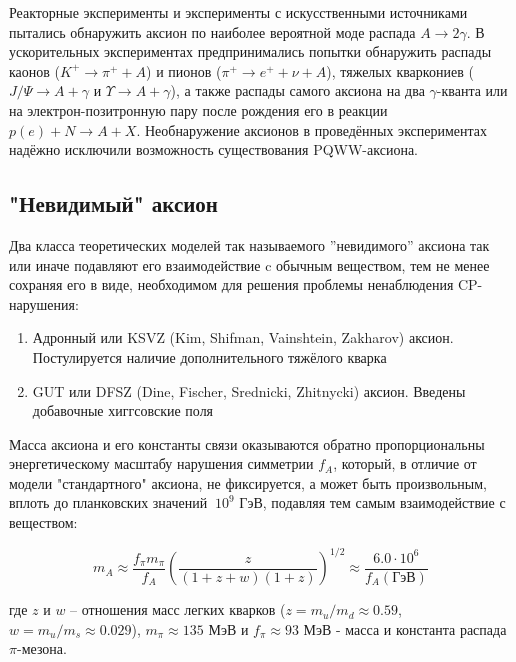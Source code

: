 \documentclass[a4paper,article,14pt]{extarticle}
\begin{document}
Реакторные эксперименты и эксперименты с искусственными источниками \cite{ReactorExperiment1, ReactorExperiment2} пытались обнаружить аксион по наиболее вероятной моде распада $A \rightarrow 2\gamma$. В ускорительных экспериментах \cite{AcceleratorExperiment1, AcceleratorExperiment2} предпринимались попытки обнаружить распады каонов ($K^+ \rightarrow \pi^+ + A$) и пионов ($\pi^+ \rightarrow e^+ + \nu + A$), тяжелых кваркониев ($ J/\Psi \rightarrow A + \gamma $ и $ \Upsilon \rightarrow A + \gamma $), а также распады самого аксиона на два $\gamma$-кванта или на электрон-позитронную пару после рождения его в реакции $ p\left(e\right) + N \rightarrow A + X $. Необнаружение аксионов в проведённых экспериментах надёжно исключили возможность существования PQWW-аксиона.

\subsection{"Невидимый" аксион}
Два класса теоретических моделей так называемого ”невидимого” аксиона так или иначе подавляют его взаимодействие c обычным веществом, тем не менее сохраняя его в виде, необходимом для решения проблемы ненаблюдения CP-нарушения:
\begin{enumerate}
    \item  Адронный или KSVZ (Kim, Shifman, Vainshtein, Zakharov) \cite{K,SVZ} аксион. Постулируется наличие дополнительного тяжёлого кварка
    \item GUT или DFSZ (Dine, Fischer, Srednicki, Zhitnycki) \cite{DFS,Z} \mbox{аксион}. Введены добавочные хиггсовские поля
\end{enumerate}

Масса аксиона и его константы связи оказываются обратно пропорциональны энергетическому масштабу нарушения симметрии $f_A$, который, в отличие от модели "стандартного" аксиона, не фиксируется, а может быть произвольным, вплоть до планковских значений $~10^9 \text{ ГэВ}$, подавляя тем самым взаимодействие с веществом:

\begin{equation}
    {m_A}\approx\frac{{{f_\pi }{m_\pi }}}{{{f_A}}} \left( \frac{z}{{\left( {1 + z + w} \right)\left( {1 + z} \right)}} \right)^{1/2} \approx \frac{{6.0 \cdot {{10}^6}}}{{{f_A}\left( \text{ГэВ} \right)}}
    \label{mA}
\end{equation}

где $z$ и $w$ – отношения масс легких кварков ($z = m_u/m_d \approx 0.59$, $w = m_u/m_s \approx 0.029 $), $m_{\pi} \approx 135 \text{ МэВ}$ и $f_{\pi} \approx 93 \text{ МэВ}$ - масса и константа распада $\pi$-мезона.
\end{document}
